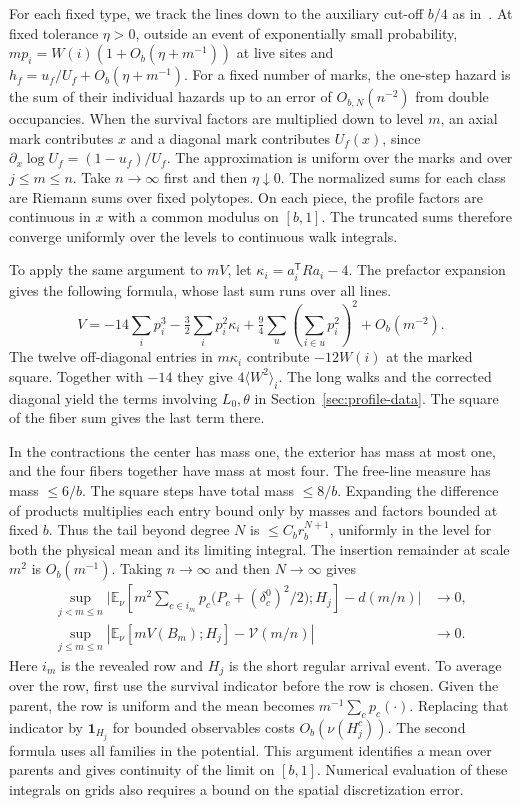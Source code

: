 For each fixed type, we track the lines down to the auxiliary cut-off \(b/4\) as in~\cite[\S4]{tc}. At
fixed tolerance \(\eta>0\), outside an event of exponentially small probability,
\(mp_i=W(i)(1+O_b(\eta+m^{-1}))\) at live sites and \(h_f=u_f/U_f+O_b(\eta+m^{-1})\). For a fixed number
of marks, the one-step hazard is the sum of their individual hazards up to an error of
\(O_{b,N}(n^{-2})\) from double occupancies. When the survival factors are multiplied down to level
\(m\), an axial mark contributes \(x\) and a diagonal mark contributes \(U_f(x)\), since \(\partial_x\log
U_f=(1-u_f)/U_f\). The approximation is uniform over the marks and over \(j\le m\le n\). Take
\(n\to\infty\) first and then \(\eta\downarrow0\). The normalized sums for each class are Riemann sums
over fixed polytopes. On each piece, the profile factors are continuous in \(x\) with a common modulus on
\([b,1]\). The truncated sums therefore converge uniformly over the levels to continuous walk integrals.

To apply the same argument to \(mV\), let \(\kappa_i=a_i^{\mathsf T}Ra_i-4\). The prefactor
expansion~\cite[\S7]{pc} gives the following formula, whose last sum runs over all lines. \[
 V=-14\sum_i p_i^3-\tfrac32\sum_i p_i^2\kappa_i
       +\tfrac94\sum_u\left(\sum_{i\in u}p_i^2\right)^2+O_b(m^{-2}).
\] The twelve off-diagonal entries in \(m\kappa_i\) contribute \(-12W(i)\) at the marked square. Together
with \(-14\) they give \(4\langle W^2\rangle_i\). The long walks and the corrected diagonal yield the
terms involving \(L_0,\theta\) in Section~\ref{sec:profile-data}. The square of the fiber sum gives the
last term there.

In the contractions the center has mass one, the exterior has mass at most one, and the four fibers
together have mass at most four. The free-line measure has mass \(\le6/b\). The square steps have total
mass \(\le8/b\). Expanding the difference of products multiplies each entry bound only by masses and
factors bounded at fixed \(b\). Thus the tail beyond degree \(N\) is \(\le C_b r_b^{N+1}\), uniformly in
the level for both the physical mean and its limiting integral. The insertion remainder at scale \(m^2\)
is \(O_b(m^{-1})\). Taking \(n\to\infty\) and then \(N\to\infty\) gives \begin{align*}
 \sup_{j<m\le n}\Big|
 \mathbb E_\nu\!\left[m^2\sum_{c\in i_m}p_c
       \big(P_c+(\delta_c^0)^2/2\big);H_j\right]-d(m/n)\Big|&\longrightarrow0,\\
 \sup_{j\le m\le n}\left|\mathbb E_\nu[mV(B_m);H_j]-\mathcal V(m/n)\right|
  &\longrightarrow0 .
\end{align*} Here \(i_m\) is the revealed row and \(H_j\) is the short regular arrival event. To average
over the row, first use the survival indicator before the row is chosen. Given the parent, the row is
uniform and the mean becomes \(m^{-1}\sum_c p_c(\cdot)\). Replacing that indicator by \(\mathbf1_{H_j}\)
for bounded observables costs \(O_b(\nu(H_j^c))\). The second formula uses all families in the potential.
This argument identifies a mean over parents and gives continuity of the limit on \([b,1]\). Numerical
evaluation of these integrals on grids also requires a bound on the spatial discretization error.

